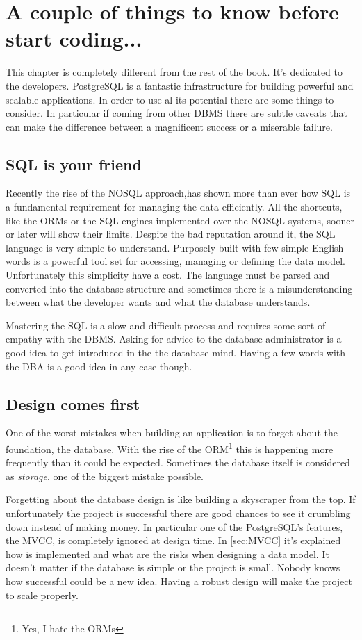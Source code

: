\chapter{A couple of things to know before start coding...}
\label{cha:COUPLETHINGS}
This chapter is completely different from the rest of the book. It's dedicated to the developers. 
PostgreSQL is a fantastic infrastructure for building powerful and scalable applications. In order 
to use al its potential there are some things to consider. In particular if coming from other DBMS 
there are subtle caveats that can make the difference between a magnificent success or a miserable 
failure. 

\section{SQL is your friend}
Recently the rise of the NOSQL approach,has shown more than ever how SQL is a fundamental 
requirement for managing the data efficiently. All the shortcuts, like the ORMs or the SQL 
engines implemented over the NOSQL systems, sooner or later will show their limits. Despite the 
bad reputation around it, the SQL language is very simple to understand. 
Purposely built with few simple English words is a powerful tool set for accessing, managing or 
defining the data model. Unfortunately this simplicity have a cost. The language must be parsed and 
converted into the database structure and sometimes there is a misunderstanding between 
what the developer wants and what the database understands.\newline 

Mastering the SQL is a slow and difficult process and requires some sort of empathy with the DBMS. 
Asking for advice to the database administrator is a good idea to get introduced in the the 
database mind. Having a few words with the DBA is a good idea in any case though.

\section{Design comes first}
One of the worst mistakes when building an application is to forget about the foundation, the 
database. With the rise of the ORM\footnote{Yes, I hate the ORMs} this is happening 
more frequently than it could be expected. Sometimes the database itself is considered as 
\textit{storage}, one of the biggest mistake possible.\newline

Forgetting about the database design is like building a skyscraper from the top. If 
unfortunately the project is successful there are good chances to see it crumbling down instead of 
making money.\newline
In particular one of the PostgreSQL's features, the MVCC, is completely ignored at design time. 
In \ref{sec:MVCC} it's explained how is implemented and what are the risks when designing a data 
model. It doesn't matter if the database is simple or the project is small. Nobody knows how 
successful could be a new idea. Having a robust design will make the project to scale properly.

